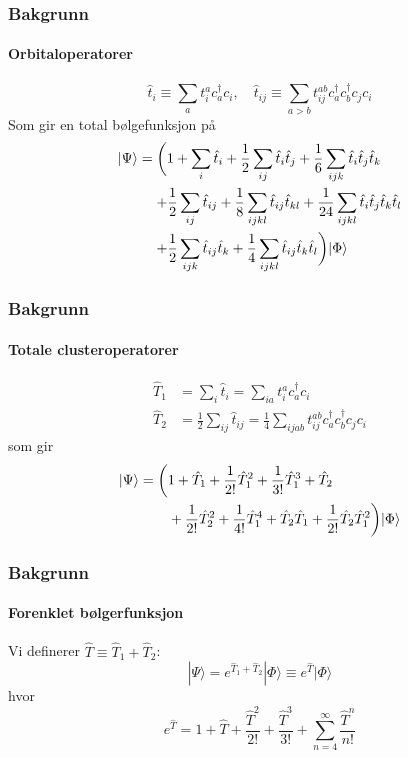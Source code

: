\documentclass[norsk,a4paper,12pt]{beamer}
\begin{document}
  \begin{frame}
    \frametitle{Bakgrunn}
    \framesubtitle{Orbitaloperatorer}
    \begin{equation}
    \hat{t}_i\equiv \sum_a t_i^a c_a^{\dagger}c_i,\quad \hat{t}_{ij}\equiv\sum_{a>b}t_{ij}^{ab}c_a^{\dagger}c_b^{\dagger}c_jc_i
    \end{equation}
    Som gir en total bølgefunksjon på 
    \begin{align}
    |\Psi\rangle&=\bigg(1+\sum_i\hat{t}_i+\frac{1}{2}\sum_{ij}\hat{t}_i\hat{t}_j+\frac{1}{6}\sum_{ijk}\hat{t}_i\hat{t}_j\hat{t}_k\notag\\
    &\mathrel{\phantom{=}}+\frac{1}{2}\sum_{ij}\hat{t}_{ij}
    +\frac{1}{8}\sum_{ijkl}\hat{t}_{ij}\hat{t}_{kl}+\frac{1}{24}\sum_{ijkl}\hat{t}_i\hat{t}_j\hat{t}_k\hat{t}_l\\
    &\mathrel{\phantom{=}}+\frac{1}{2}\sum_{ijk}\hat{t}_{ij}\hat{t}_k+\frac{1}{4}\sum_{ijkl}\hat{t}_{ij}\hat{t}_k\hat{t}_l\bigg)|\Phi\rangle\notag
    \end{align}
  \end{frame}
  
  \begin{frame}
    \frametitle{Bakgrunn}
    \framesubtitle{Totale clusteroperatorer}
    \begin{align}
    \hat{T}_1&=\sum_i\hat{t}_i=\sum_{ia}t_i^ac_a^{\dagger}c_i\\
    \hat{T}_2&=\frac{1}{2}\sum_{ij}\hat{t}_{ij}=\frac{1}{4}\sum_{ijab}t_{ij}^{ab}c_a^{\dagger}c_b^{\dagger}c_jc_i
    \end{align}
    som gir
    \begin{align}
    |\Psi\rangle=\bigg(&1+\hat{T}_1+\frac{1}{2!}\hat{T}_1^2+\frac{1}{3!}\hat{T}_1^3+\hat{T}_2\notag\\
    &+\frac{1}{2!}\hat{T}_2^2+\frac{1}{4!}\hat{T}_1^4+\hat{T}_2\hat{T}_1+\frac{1}{2!}\hat{T}_2\hat{T}_1^2\bigg)|\Phi\rangle
    \end{align}
  \end{frame}
  
  \begin{frame}
    \frametitle{Bakgrunn}
    \framesubtitle{Forenklet bølgerfunksjon}
    Vi definerer $\hat{T}\equiv\hat{T}_1+\hat{T}_2$:
    \begin{equation}
    |\Psi\rangle=e^{\hat{T}_1+\hat{T}_2}|\Phi\rangle\equiv e^{\hat{T}}|\Phi\rangle
    \end{equation}
    hvor
    \begin{equation}
    e^{\hat{T}}=1+\hat{T}+\frac{\hat{T}^2}{2!}+\frac{\hat{T}^3}{3!}+\sum_{n=4}^{\infty}\frac{\hat{T}^n}{n!}
    \end{equation}
  \end{frame}
  
\end{document}
